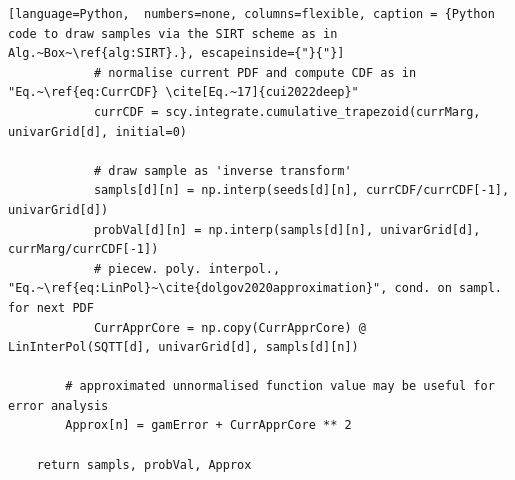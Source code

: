 \begin{lstlisting}[language=Python,	 numbers=none, columns=flexible, caption = {Python code to draw samples via the SIRT scheme as in Alg.~Box~\ref{alg:SIRT}.}, escapeinside={"}{"}]
			# normalise current PDF and compute CDF as in "Eq.~\ref{eq:CurrCDF} \cite[Eq.~17]{cui2022deep}"
			currCDF = scy.integrate.cumulative_trapezoid(currMarg, univarGrid[d], initial=0) 
			
			# draw sample as 'inverse transform'
			sampls[d][n] = np.interp(seeds[d][n], currCDF/currCDF[-1], univarGrid[d])
			probVal[d][n] = np.interp(sampls[d][n], univarGrid[d], currMarg/currCDF[-1])
			# piecew. poly. interpol., "Eq.~\ref{eq:LinPol}~\cite{dolgov2020approximation}", cond. on sampl. for next PDF
			CurrApprCore = np.copy(CurrApprCore) @ LinInterPol(SQTT[d], univarGrid[d], sampls[d][n]) 
	
		# approximated unnormalised function value may be useful for error analysis
		Approx[n] = gamError + CurrApprCore ** 2
	
	return sampls, probVal, Approx
\end{lstlisting}
\clearpage
